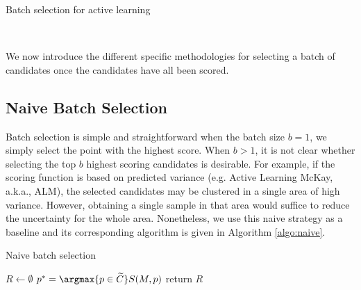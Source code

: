 {\fontsize{10}{10}\selectfont
\begin{algorithm}
\scriptsize
\caption{Batch selection for active learning}
\label{algo:al}
\begin{algorithmic}
\\
\EndWhile
\end{algorithmic}
\end{algorithm}
}

We now introduce the different specific methodologies for selecting a batch of candidates once the candidates have all been scored.

\subsection{Naive Batch Selection}
Batch selection is simple and straightforward when the batch size $b = 1$, we simply select the point with the highest score.
%
When $b>1$, it is not clear whether selecting the top $b$ highest scoring candidates is desirable.
%
For example, if the scoring function is based on predicted variance (e.g. Active Learning McKay, a.k.a., ALM), the selected candidates may be clustered in a single area of high variance.
%
However, obtaining a single sample in that area would suffice to reduce the uncertainty for the whole area.
%
Nonetheless, we use this naive strategy as a baseline and its corresponding algorithm is given in Algorithm \ref{algo:naive}.

{\fontsize{10}{10}\selectfont
\begin{algorithm}
\scriptsize
\caption{Naive batch selection}
\label{algo:naive}
\begin{algorithmic}
  \State $R \gets \emptyset$
  \State $p^* = \argmax{p \in \widetilde{C}} S(M, p)$
  \EndWhile
  \State return $R$
\EndProcedure
\end{algorithmic}
\end{algorithm}
}

